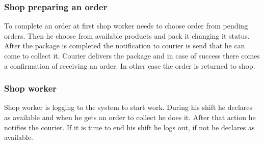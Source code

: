 \documentclass[../main.tex]{subfiles}
\begin{document}
\subsubsection{Shop preparing an order}
\vspace{5mm}
\vspace{5mm}


To complete an order at first shop worker needs to choose order from pending orders. Then he choose from available products and pack it changing it status. After the package is completed the notification to courier is send that he can come to collect it. Courier delivers the package and in case of success there comes a confirmation of receiving an order. In other case the order is returned to shop.
\subsubsection{Shop worker}
\vspace{5mm}
\vspace{5mm}


Shop worker is logging to the system to start work. During his shift he declares as available and when he gets an order to collect he does it. After that action he notifies the courier. If it is time to end his shift he logs out, if not he declares as available.
\end{document}
